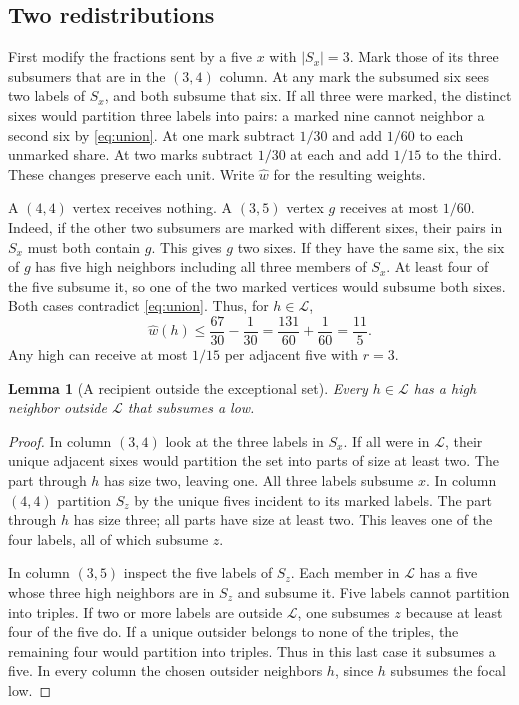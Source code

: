 \documentclass[11pt,a4paper]{amsart}
\newtheorem{lemma}[theorem]{Lemma}
\newcommand{\LL}{\mathcal L}
\newcommand{\wt}{\widehat w}
\begin{document}
\subsection{Two redistributions}
First modify the fractions sent by a five $x$ with $|S_x|=3$.
Mark those of its three subsumers that are in the $(3,4)$ column.
At any mark the subsumed six sees two labels of $S_x$, and both
subsume that six. If all three were marked, the distinct sixes
would partition three labels into pairs: a marked nine cannot
neighbor a second six by \eqref{eq:union}. At one mark subtract
$1/30$ and add $1/60$ to each unmarked share. At two marks subtract
$1/30$ at each and add $1/15$ to the third. These changes preserve
each unit. Write $\wt$ for the resulting weights.

A $(4,4)$ vertex receives nothing. A $(3,5)$ vertex $g$ receives
at most $1/60$. Indeed, if the other two subsumers are marked with
different sixes, their pairs in $S_x$ must both contain $g$.
This gives $g$ two sixes. If they have the same six, the six of $g$
has five high neighbors including all three members of $S_x$.
At least four of the five subsume it, so one of the two marked
vertices would subsume both sixes. Both cases contradict
\eqref{eq:union}. Thus, for $h\in\LL$,
\begin{equation}\label{eq:limit}
\wt(h)\le
 \frac{67}{30}-\frac1{30}
 =\frac{131}{60}+\frac1{60}=\frac{11}{5}.
\end{equation}
Any high can receive at most $1/15$ per adjacent five with $r=3$.

\begin{lemma}[A recipient outside the exceptional set]\label{lem:recipient}
Every $h\in\LL$ has a high neighbor outside $\LL$ that subsumes a low.
\end{lemma}
\begin{proof}
In column $(3,4)$ look at the three labels in $S_x$. If all were
in $\LL$, their unique adjacent sixes would partition the set into
parts of size at least two. The part through $h$ has size two,
leaving one. All three labels subsume $x$. In column $(4,4)$
partition $S_z$ by the unique fives incident to its marked labels.
The part through $h$ has size three; all parts have size at least
two. This leaves one of the four labels, all of which subsume $z$.

In column $(3,5)$ inspect the five labels of $S_z$. Each member
in $\LL$ has a five whose three high neighbors are in $S_z$ and
subsume it. Five labels cannot partition into triples. If two or
more labels are outside $\LL$, one subsumes $z$ because at least
four of the five do. If a unique outsider belongs to none of the
triples, the remaining four would partition into triples. Thus in
this last case it subsumes a five. In every column the chosen
outsider neighbors $h$, since $h$ subsumes the focal low.
\end{proof}
\end{document}
